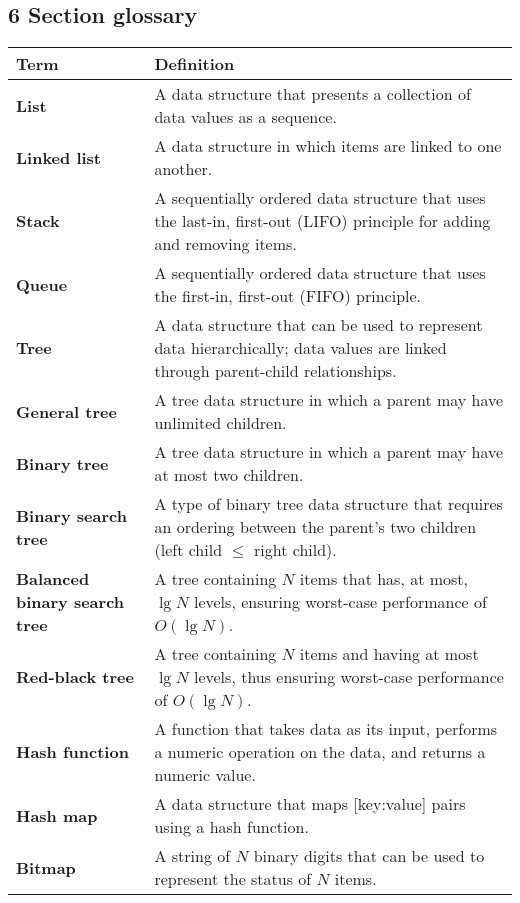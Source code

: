 \documentclass{article}
\begin{document}
\subsection*{6 Section glossary}
\centering
\begin{tabular}{>{\raggedright}p{} >{\raggedright\arraybackslash}p{}}
\toprule
\textbf{Term} & \textbf{Definition} \\
\midrule
\textbf{List} & A data structure that presents a collection of data values as a sequence. \\
\textbf{Linked list} & A data structure in which items are linked to one another. \\
\textbf{Stack} & A sequentially ordered data structure that uses the last-in, first-out (LIFO) principle for adding and removing items. \\
\textbf{Queue} & A sequentially ordered data structure that uses the first-in, first-out (FIFO) principle. \\
\textbf{Tree} & A data structure that can be used to represent data hierarchically; data values are linked through parent-child relationships. \\
\textbf{General tree} & A tree data structure in which a parent may have unlimited children. \\
\textbf{Binary tree} & A tree data structure in which a parent may have at most two children. \\
\textbf{Binary search tree} & A type of binary tree data structure that requires an ordering between the parent's two children (left child $\le$ right child). \\
\textbf{Balanced binary search tree} & A tree containing $N$ items that has, at most, $\lg N$ levels, ensuring worst-case performance of $O(\lg N)$. \\
\textbf{Red-black tree} & A tree containing $N$ items and having at most $\lg N$ levels, thus ensuring worst-case performance of $O(\lg N)$. \\
\textbf{Hash function} & A function that takes data as its input, performs a numeric operation on the data, and returns a numeric value. \\
\textbf{Hash map} & A data structure that maps [key:value] pairs using a hash function. \\
\textbf{Bitmap} & A string of $N$ binary digits that can be used to represent the status of $N$ items. \\
\bottomrule
\end{tabular}
\vspace{\baselineskip}
\newpage
\end{document}
